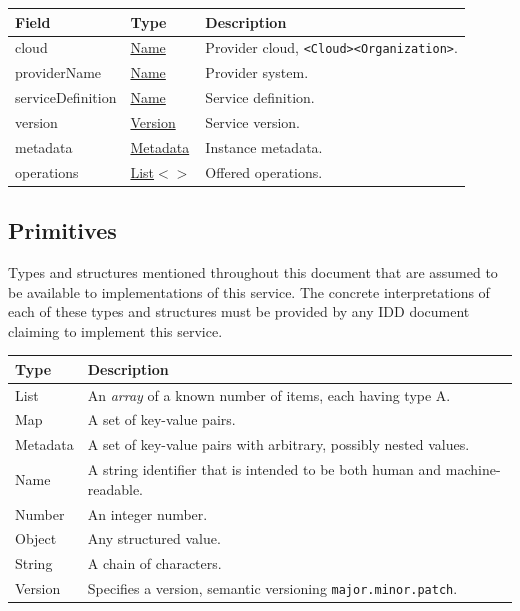 \documentclass[a4paper]{arrowhead}
\newcommand{\pdef}[1]{{\textcolor{ArrowheadGrey}{#1\label{sec:model:primitives:#1}\label{sec:model:primitives:#1s}\label{sec:model:primitives:#1es}}}}
\newcommand{\pref}[1]{{\textcolor{ArrowheadGrey}{\hyperref[sec:model:primitives:#1]{#1}}}}
\begin{document}




\noindent\begin{tabularx}{\textwidth}{| >{\raggedright\arraybackslash}p{3.9cm} | >{\raggedright\arraybackslash\small}p{5.3cm} | X |} \hline
\rowcolor{gray!33} Field & Type & Description \\ \hline
cloud & \pref{Name} & Provider cloud, \texttt{\textless{}Cloud\textgreater{}\textbar{}\allowbreak{}\textless{}Organization\textgreater{}}. \\ \hline
provider\allowbreak{}Name & \pref{Name} & Provider system. \\ \hline
service\allowbreak{}Definition & \pref{Name} & Service definition. \\ \hline
version & \pref{Version} & Service version. \\ \hline
metadata & \pref{Metadata} & Instance metadata. \\ \hline
operations & \pref{List}$<$\allowbreak{}\pref{String}$>$ & Offered operations. \\ \hline
\end{tabularx}



\subsection{Primitives}
\label{sec:model:primitives}

Types and structures mentioned throughout this document that are assumed to be available to implementations of this service.
The concrete interpretations of each of these types and structures must be provided by any IDD document claiming to implement this service.

\noindent\begin{tabularx}{\textwidth}{| p{4.6cm} | X |} \hline
\rowcolor{gray!33} Type & Description \\ \hline
\pdef{List} & An \textit{array} of a known number of items, each having type A. \\ \hline
\pdef{Map} & A set of key-value pairs. \\ \hline
\pdef{Metadata} & A set of key-value pairs with arbitrary, possibly nested values. \\ \hline
\pdef{Name} & A string identifier that is intended to be both human and machine-readable. \\ \hline
\pdef{Number} & An integer number. \\ \hline
\pdef{Object} & Any structured value. \\ \hline
\pdef{String} & A chain of characters. \\ \hline
\pdef{Version} & Specifies a version, semantic versioning \texttt{major.minor.patch}. \\ \hline
\end{tabularx}
\end{document}
